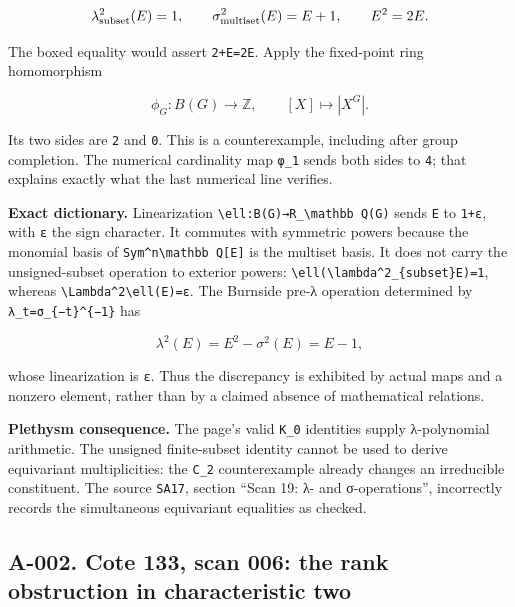 \documentclass[
  10pt,
]{article}
\begin{document}
\[
\lambda^2_{\rm subset}(E)=1,\qquad
\sigma^2_{\rm multiset}(E)=E+1,\qquad E^2=2E.
\]

The boxed equality would assert
\texttt{\small 2+\allowbreak{}E=\allowbreak{}2E}. Apply the fixed-point
ring homomorphism

\[
\phi_G:B(G)\longrightarrow\mathbb Z,
\qquad [X]\longmapsto|X^G|.
\]

Its two sides are \texttt{\small 2} and \texttt{\small 0}. This is a
counterexample, including after group completion. The numerical
cardinality map \texttt{\small φ\_\allowbreak{}1} sends both sides to
\texttt{\small 4}; that explains exactly what the last numerical line
verifies.

\textbf{Exact dictionary.} Linearization
\texttt{\small \textbackslash{}ell:\allowbreak{}B(\allowbreak{}G)\allowbreak{}→\allowbreak{}R\_\allowbreak{}\textbackslash{}mathbb Q(\allowbreak{}G)\allowbreak{}}
sends \texttt{\small E} to \texttt{\small 1+\allowbreak{}ε}, with
\texttt{\small ε} the sign character. It commutes with symmetric powers
because the monomial basis of
\texttt{\small Sym\textasciicircum{}n\textbackslash{}mathbb Q[\allowbreak{}E]\allowbreak{}}
is the multiset basis. It does not carry the unsigned-subset operation
to exterior powers:
\texttt{\small \textbackslash{}ell(\allowbreak{}\textbackslash{}lambda\textasciicircum{}2\_\allowbreak{}\{subset\}E)\allowbreak{}=\allowbreak{}1},
whereas
\texttt{\small \textbackslash{}Lambda\textasciicircum{}2\textbackslash{}ell(\allowbreak{}E)\allowbreak{}=\allowbreak{}ε}.
The Burnside pre-λ operation determined by
\texttt{\small λ\_\allowbreak{}t=\allowbreak{}σ\_\allowbreak{}\{−t\}\textasciicircum{}\{−1\}}
has

\[
\lambda^2(E)=E^2-\sigma^2(E)=E-1,
\]

whose linearization is \texttt{\small ε}. Thus the discrepancy is
exhibited by actual maps and a nonzero element, rather than by a claimed
absence of mathematical relations.

\textbf{Plethysm consequence.} The page's valid
\texttt{\small K\_\allowbreak{}0} identities supply λ-polynomial
arithmetic. The unsigned finite-subset identity cannot be used to derive
equivariant multiplicities: the \texttt{\small C\_\allowbreak{}2}
counterexample already changes an irreducible constituent. The source
\texttt{\small SA17}, section ``Scan 19: λ- and σ-operations'',
incorrectly records the simultaneous equivariant equalities as checked.

\subsection{A-002. Cote 133, scan 006: the rank obstruction in
characteristic
two}\label{a-002.-cote-133-scan-006-the-rank-obstruction-in-characteristic-two}
\end{document}

